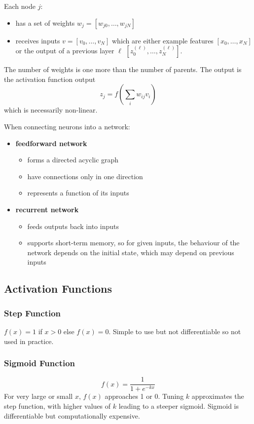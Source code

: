 \documentclass[11pt]{article}
\begin{document}
Each node \(j\):
\begin{itemize}
\item has a set of weights \(w_{j} = [w_{j0}, \dots, w_{jN}]\)
\item receives inputs \(v = [v_{0}, \dots, v_{N}]\) which are either example features
\([x_{0}, \dots, x_{N}]\) or the output of a previous layer \(\ell\)
\([z^{(\ell)}_{0}, \dots, z^{(\ell)}_{N}]\).
\end{itemize}

The number of weights is one more than the number of parents.
The output is the activation function output
$$ z_{j} = f \left( \sum_{i} w_{ij} v_{i} \right) $$
which is necessarily non-linear.

When connecting neurons into a network:
\begin{itemize}
\item \textbf{feedforward network}
\begin{itemize}
\item forms a directed acyclic graph
\item have connections only in one direction
\item represents a function of its inputs
\end{itemize}
\item \textbf{recurrent network}
\begin{itemize}
\item feeds outputs back into inputs
\item supports short-term memory, so for given inputs, the behaviour of the network
depends on the initial state, which may depend on previous inputs
\end{itemize}
\end{itemize}
\subsection{Activation Functions}
\label{sec:orgf585f5a}
\subsubsection{Step Function}
\label{sec:org13c26fb}
\(f(x) = 1\) if \(x > 0\) else \(f(x) = 0\).
Simple to use but not differentiable so not used in practice.
\subsubsection{Sigmoid Function}
\label{sec:orge442606}
$$ f(x) = \frac{1}{1 + e^{-kx}} $$
For very large or small \(x\), \(f(x)\) approaches 1 or 0.
Tuning \(k\) approximates the step function, with higher values of \(k\)
leading to a steeper sigmoid.
Sigmoid is differentiable but computationally expensive.
\end{document}
